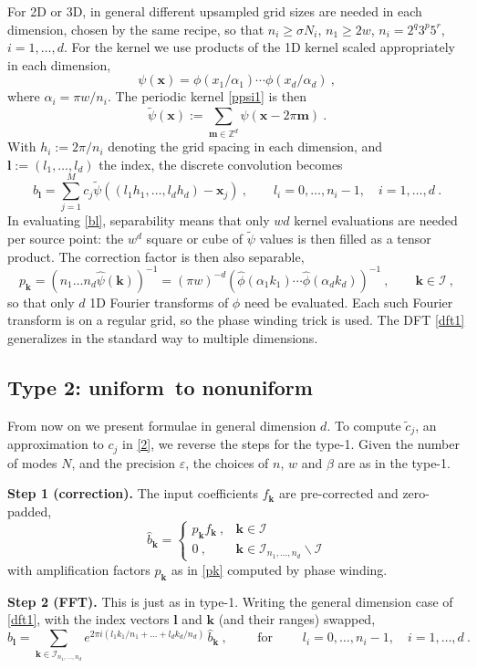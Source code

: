 \documentclass[10pt]{article}
\newcommand{\be}{\begin{equation}}
\newcommand{\ee}{\end{equation}}
\newcommand{\mbf}[1]{{\mathbf #1}}
\newcommand{\ZZ}{\mathbb{Z}}
\newcommand{\eps}{\varepsilon}
\newcommand{\xx}{\mbf{x}}
\newcommand{\kk}{\mbf{k}}
\newcommand{\KK}{{\mathcal I}}     %
\newcommand{\rat}{\sigma}          %
\newcommand{\ppsi}{{\tilde\psi}}   %
\newcommand{\al}{\alpha}           %
\newcommand{\NU}{{nonuniform}}       %
\newcommand{\U}{{uniform}}
\begin{document}
For 2D or 3D, in general different
upsampled grid sizes are needed in each dimension,
chosen by the same recipe, so that $n_i \ge \rat N_i$, $n_1 \ge 2w$,
$n_i = 2^q3^p5^r$, $i=1,\dots,d$.
For the kernel we use products of the 1D kernel scaled appropriately
in each dimension,
\be
\psi(\xx) = \phi(x_1/\al_1) \cdots \phi(x_d/\al_d)
~,
\ee
where $\al_i=\pi w/n_i$.
The periodic kernel \eqref{ppsi1} is then
\be
\ppsi(\xx) := \sum_{\mbf{m} \in \ZZ^d} \psi(\xx - 2\pi\mbf{m})
~.
\label{ppsi}
\ee
With $h_i:=2\pi/n_i$ denoting the grid spacing in each dimension,
and $\mbf{l}:=(l_1,\dots,l_d)$ the index,
the discrete convolution %
becomes
\be
b_\mbf{l} = \sum_{j=1}^M c_j \ppsi((l_1h_1,\dots,l_dh_d)-\xx_j)~,
\qquad l_i=0,\dots,n_i-1, \quad i=1,\dots,d
~.
\label{bl}
\ee
In evaluating \eqref{bl}, separability
means that only $wd$ kernel evaluations are needed per source point:
the $w^d$ square or cube of $\ppsi$ values is then filled as a tensor product.
The correction factor is then also separable,
\be
p_\kk = (n_1\dots n_d \hat\psi(\kk))^{-1} = (\pi w)^{-d}
(\hat\phi(\al_1 k_1) \cdots \hat\phi(\al_d k_d))^{-1}
~, \qquad \kk \in \KK~,
\label{pk}
\ee
so that only $d$ 1D Fourier transforms of $\phi$ need be evaluated.
Each such Fourier transform is on a regular grid, so the phase winding
trick is used.
The DFT \eqref{dft1} generalizes in the standard way to
multiple dimensions.



\subsection{Type 2: \U\ to \NU}
\label{s:2}

From now on we present formulae in general dimension $d$.
To compute $\tilde c_j$, an approximation to $c_j$ in \eqref{2},
we reverse the steps for the type-1.
Given the number of modes $N$, and the precision $\eps$,
the choices of $n$, $w$ and $\beta$ are as in the type-1.

{\bf Step 1 (correction).}
The input coefficients $f_\kk$ are pre-corrected and zero-padded,
\be
\hat b_\kk = \left\{\begin{array}{ll}p_\kk f_\kk~, & \kk \in \KK \\
0~, & \kk \in \KK_{n_1,\dots,n_d} \backslash \KK
\end{array}\right.
\ee
with amplification factors $p_\kk$ as in \eqref{pk} computed by phase winding.

{\bf Step 2 (FFT).}
This is just as in type-1. Writing the general dimension
case of \eqref{dft1}, with the index vectors $\mbf{l}$
and $\kk$ (and their ranges) swapped,
\be
b_\mbf{l} = \sum_{\kk\in\KK_{n_1,\dots,n_d}}
e^{2\pi i (l_1k_1/n_1 + \dots + l_dk_d/n_d)}
\,\hat b_\kk ~, \qquad \mbox{ for }
\qquad l_i=0,\dots,n_i-1, \quad i=1,\dots,d
~.
\label{dft}
\ee
\end{document}
